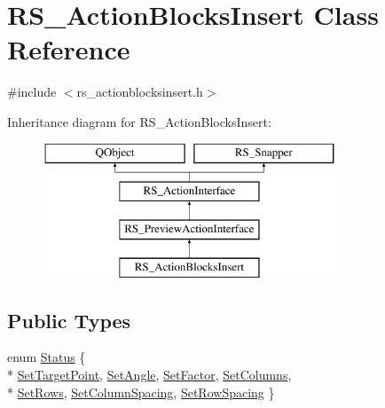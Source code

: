 \hypertarget{classRS__ActionBlocksInsert}{\section{R\-S\-\_\-\-Action\-Blocks\-Insert Class Reference}
\label{classRS__ActionBlocksInsert}
}


{\ttfamily \#include $<$rs\-\_\-actionblocksinsert.\-h$>$}

Inheritance diagram for R\-S\-\_\-\-Action\-Blocks\-Insert\-:\begin{figure}[H]
\begin{center}
\leavevmode
\includegraphics[height=4.000000cm]{classRS__ActionBlocksInsert}
\end{center}
\end{figure}
\subsection*{Public Types}
\begin{DoxyCompactItemize}
\item 
enum \hyperlink{classRS__ActionBlocksInsert_ab26cc8e619eca4fac8c57f59d9698b4a}{Status} \{ \\*
\hyperlink{classRS__ActionBlocksInsert_ab26cc8e619eca4fac8c57f59d9698b4aa47bc37ce301d1ad7d9d31cea2267d17b}{Set\-Target\-Point}, 
\hyperlink{classRS__ActionBlocksInsert_ab26cc8e619eca4fac8c57f59d9698b4aa5267c179bc6a46cf64a651e7fbbad4f6}{Set\-Angle}, 
\hyperlink{classRS__ActionBlocksInsert_ab26cc8e619eca4fac8c57f59d9698b4aa1bcd1450bd26fb9040c1b389701bd25d}{Set\-Factor}, 
\hyperlink{classRS__ActionBlocksInsert_ab26cc8e619eca4fac8c57f59d9698b4aa27c5deac211157c92bf06c44d69a5f5e}{Set\-Columns}, 
\\*
\hyperlink{classRS__ActionBlocksInsert_ab26cc8e619eca4fac8c57f59d9698b4aad002223978fbdd790142e75d03ed791c}{Set\-Rows}, 
\hyperlink{classRS__ActionBlocksInsert_ab26cc8e619eca4fac8c57f59d9698b4aa112f6faf4cbf9e7226676b091563315b}{Set\-Column\-Spacing}, 
\hyperlink{classRS__ActionBlocksInsert_ab26cc8e619eca4fac8c57f59d9698b4aabcfbdfadec19817978554798f63e6550}{Set\-Row\-Spacing}
 \}
\end{DoxyCompactItemize}

